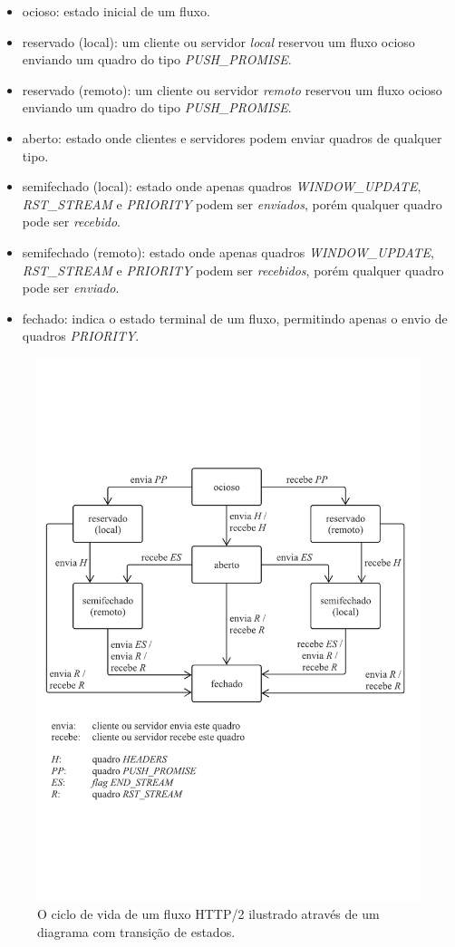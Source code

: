 \begin{itemize}
    \item ocioso: estado inicial de um fluxo.
    \item reservado (local): um cliente ou servidor {\em local} reservou um fluxo ocioso enviando um quadro do tipo {\em PUSH\_PROMISE}. 
    \item reservado (remoto): um cliente ou servidor {\em remoto} reservou um fluxo ocioso enviando um quadro do tipo {\em PUSH\_PROMISE}.
    \item aberto: estado onde clientes e servidores podem enviar quadros de qualquer tipo.
    \item semifechado (local): estado onde apenas quadros {\em WINDOW\_UPDATE}, {\em RST\_STREAM} e {\em PRIORITY} podem ser {\em enviados}, porém qualquer quadro pode ser {\em recebido}.
    \item semifechado (remoto): estado onde apenas quadros {\em WINDOW\_UPDATE}, {\em RST\_STREAM} e {\em PRIORITY} podem ser {\em recebidos}, porém qualquer quadro pode ser {\em enviado}. 
    \item fechado: indica o estado terminal de um fluxo, permitindo apenas o envio de quadros {\em PRIORITY}.
\end{itemize}

\begin{figure}[hbt!]
 \centering
  \includegraphics[width=\textwidth]{./fig/ciclo_fluxo}
 \caption{O ciclo de vida de um fluxo HTTP/2 ilustrado através de um diagrama com transição de estados.}
 \label{fig:ciclo_fluxo}
\end{figure}

